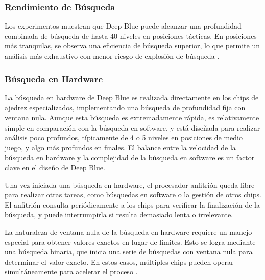\documentclass[12pt,a4paper]{article}
\begin{document}
\subsubsection*{Rendimiento de Búsqueda}
Los experimentos muestran que Deep Blue puede alcanzar una profundidad combinada de búsqueda de hasta 40 niveles en posiciones tácticas. En posiciones más tranquilas, se observa una eficiencia de búsqueda superior, lo que permite un análisis más exhaustivo con menor riesgo de explosión de búsqueda \cite{campbell2002deepblue}.

\subsubsection{Búsqueda en Hardware}

La búsqueda en hardware de Deep Blue es realizada directamente en los chips de ajedrez especializados, implementando una búsqueda de profundidad fija con ventana nula. Aunque esta búsqueda es extremadamente rápida, es relativamente simple en comparación con la búsqueda en software, y está diseñada para realizar análisis poco profundos, típicamente de 4 o 5 niveles en posiciones de medio juego, y algo más profundos en finales. El balance entre la velocidad de la búsqueda en hardware y la complejidad de la búsqueda en software es un factor clave en el diseño de Deep Blue.

Una vez iniciada una búsqueda en hardware, el procesador anfitrión queda libre para realizar otras tareas, como búsquedas en software o la gestión de otros chips. El anfitrión consulta periódicamente a los chips para verificar la finalización de la búsqueda, y puede interrumpirla si resulta demasiado lenta o irrelevante.

La naturaleza de ventana nula de la búsqueda en hardware requiere un manejo especial para obtener valores exactos en lugar de límites. Esto se logra mediante una búsqueda binaria, que inicia una serie de búsquedas con ventana nula para determinar el valor exacto. En estos casos, múltiples chips pueden operar simultáneamente para acelerar el proceso \cite{campbell2002deepblue}.
\end{document}
